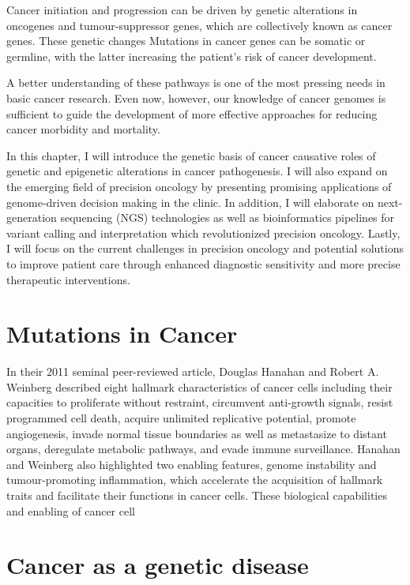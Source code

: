 Cancer initiation and progression can be driven by genetic alterations in oncogenes and tumour-suppressor genes, which are collectively known as cancer genes. These genetic changes Mutations in cancer genes can be somatic or germline, with the latter increasing the patient's risk of cancer development.

A better understanding of these pathways is one of the most pressing needs in basic cancer research. Even now, however, our knowledge of cancer genomes is sufficient to guide the development of more effective approaches for reducing cancer morbidity and mortality.

In this chapter, I will introduce the genetic basis of cancer causative roles of genetic and epigenetic alterations in cancer pathogenesis. I will also expand on the emerging field of precision oncology by presenting promising applications of genome-driven decision making in the clinic. In addition, I will elaborate on next-generation sequencing (NGS) technologies as well as bioinformatics pipelines for variant calling and interpretation which revolutionized precision oncology. Lastly, I will focus on the current challenges in precision oncology and potential solutions to improve patient care through enhanced diagnostic sensitivity and more precise therapeutic interventions.

\section{Mutations in Cancer}
\label{sec:MutationsinCancer}

In their 2011 seminal peer-reviewed article, Douglas Hanahan and Robert A. Weinberg described eight hallmark characteristics of cancer cells including their capacities to proliferate without restraint, circumvent anti-growth signals, resist programmed cell death, acquire unlimited replicative potential, promote angiogenesis, invade normal tissue boundaries as well as metastasize to distant organs, deregulate metabolic pathways, and evade immune surveillance. Hanahan and Weinberg also highlighted two enabling features, genome instability and tumour-promoting inflammation, which accelerate the acquisition of hallmark traits and facilitate their functions in cancer cells. These biological capabilities and enabling of cancer cell

\section{Cancer as a genetic disease}
\label{sec:Cancerasageneticdisease}

